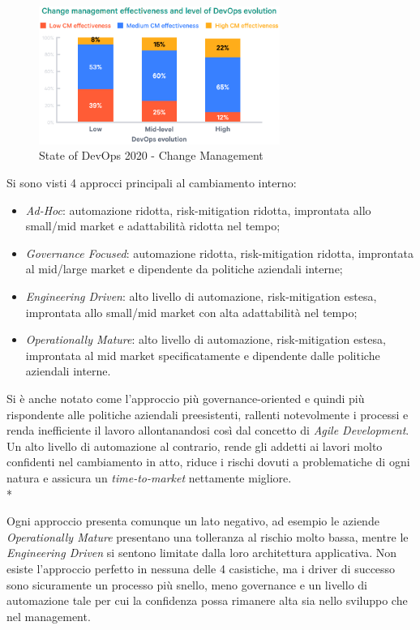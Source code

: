 \documentclass[a4paper,12pt]{report}
\begin{document}
	        \begin{figure}[h]
				\centering
				\includegraphics[width=0.7\textwidth]{devops_change_mgmt}
				\caption{State of DevOps 2020 - Change Management}
				\label{fig:devops_change_mgmt}
			\end{figure}
	        
	        Si sono visti 4 approcci principali al cambiamento interno:
	        \begin{itemize}
	            \item \emph{Ad-Hoc}: automazione ridotta, risk-mitigation ridotta, improntata allo small/mid market e adattabilità ridotta nel tempo;
	            \item \emph{Governance Focused}: automazione ridotta, risk-mitigation ridotta, improntata al mid/large market e dipendente da politiche aziendali interne;
	            \item \emph{Engineering Driven}: alto livello di automazione, risk-mitigation estesa, improntata allo small/mid market con alta adattabilità nel tempo;
	            \item \emph{Operationally Mature}: alto livello di automazione, risk-mitigation estesa, improntata al mid market specificatamente e dipendente dalle politiche aziendali interne.
	        \end{itemize}
	
	        Si è anche notato come l'approccio più governance-oriented e quindi più rispondente alle politiche aziendali preesistenti, rallenti notevolmente i processi e renda inefficiente il lavoro allontanandosi così dal concetto di \emph{Agile Development}. Un alto livello di automazione al contrario, rende gli addetti ai lavori molto confidenti nel cambiamento in atto, riduce i rischi dovuti a problematiche di ogni natura e assicura un \emph{time-to-market} nettamente migliore.\\*
	
	        Ogni approccio presenta comunque un lato negativo, ad esempio le aziende \emph{Operationally Mature} presentano una tolleranza al rischio molto bassa, mentre le \emph{Engineering Driven} si sentono limitate dalla loro architettura applicativa. Non esiste l'approccio perfetto in nessuna delle 4 casistiche, ma i driver di successo sono sicuramente un processo più snello, meno governance e un livello di automazione tale per cui la confidenza possa rimanere alta sia nello sviluppo che nel management.
	
\end{document}
